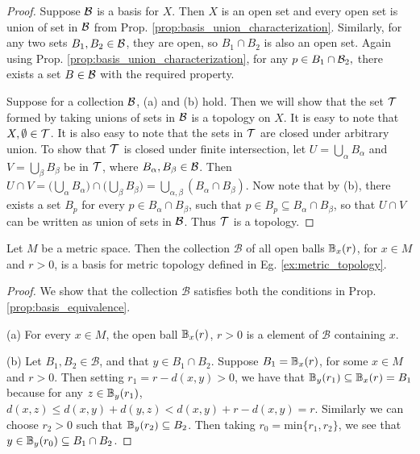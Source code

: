 \documentclass[11pt,a4paper]{article}
\begin{document}
\begin{proof}
\forward Suppose $\mathcal{B}$ is a basis for $X$. Then $X$ is an open set and every open set is union of set in $\mathcal{B}$ from Prop. \ref{prop:basis_union_characterization}. Similarly, for any two sets $B_1, B_2\in \mathcal{B}$, they are open, so $B_1\cap B_2$ is also an open set. Again using Prop. \ref{prop:basis_union_characterization}, for any $p\in B_1\cap \mathcal{B}_2,$ there exists a set $B\in \mathcal{B}$ with the required property.

\noindent\converse Suppose for a collection $\mathcal{B}$, (a) and (b) hold. Then we will show that the set $\mathcal{T}$ formed by taking unions of sets in $\mathcal{B}$ is a topology on $X$. It is easy to note that $X,\emptyset\in \mathcal{T}$. It is also easy to note that the sets in $\mathcal{T}$ are closed under arbitrary union. To show that $\mathcal{T}$ is closed under finite intersection, let $U = \bigcup_{\alpha} B_\alpha$ and $V = \bigcup_{\beta}B_\beta$ be in $\mathcal{T}$, where $B_\alpha, B_\beta\in \mathcal{B}$. Then $U\cap V = \Big(\bigcup_{\alpha}B_\alpha\Big) \cap \Big(\bigcup_{\beta}B_\beta\Big) = \bigcup_{\alpha,\beta} (B_\alpha\cap B_\beta)$. Now note that by (b), there exists a set $B_p$ for every $p\in B_\alpha\cap B_\beta$, such that $p\in B_p\subseteq B_\alpha\cap B_\beta$, so that $U\cap V$ can be written as union of sets in $\mathcal{B}$. Thus $\mathcal{T}$ is a topology.
\end{proof}

\begin{proposition}
Let $M$ be a metric space. Then the collection $\mathcal{B}$ of all open balls $\mathbb{B}_x(r)$, for $x\in M$ and $r>0$, is a basis for metric topology defined in Eg. \ref{ex:metric_topology}.
\end{proposition}

\begin{proof}
We show that the collection $\mathcal{B}$ satisfies both the conditions in Prop. \ref{prop:basis_equivalence}.

\noindent(a) For every $x\in M$, the open ball $\mathbb{B}_x(r)$, $r>0$ is a element of $\mathcal{B}$ containing $x$.

\noindent(b) Let $B_1, B_2\in\mathcal{B}$, and that $y\in B_1\cap B_2$. Suppose $B_1 = \mathbb{B}_x(r)$, for some $x\in M$ and $r>0$. Then setting $r_1 = r-d(x,y)>0$, we have that $\mathbb{B}_y(r_1)\subseteq \mathbb{B}_x(r) = B_1$ because for any $z\in \mathbb{B}_y(r_1)$, $d(x,z)\le d(x,y)+d(y,z) < d(x,y) + r - d(x,y) = r$. Similarly we can choose $r_2>0$ such that $\mathbb{B}_y(r_2)\subseteq B_2$. Then taking $r_0 = \text{min}\{r_1,r_2\}$, we see that $y\in \mathbb{B}_y(r_0)\subseteq B_1\cap B_2$.
\end{proof}
\end{document}
